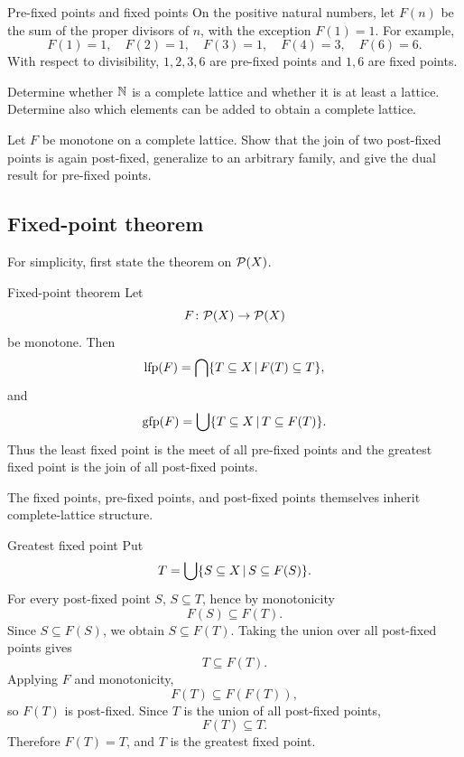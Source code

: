 \documentclass[a4paper]{article}
\newcommand{\lfp}{\operatorname{lfp}}
\newcommand{\gfp}{\operatorname{gfp}}
\begin{document}
\begin{snippetexample}{Pre-fixed points and fixed points}
    On the positive natural numbers, let \(F(n)\) be the sum of the proper divisors of \(n\), with the exception \(F(1)=1\).
    For example,
    \[
        F(1)=1,
        \quad
        F(2)=1,
        \quad
        F(3)=1,
        \quad
        F(4)=3,
        \quad
        F(6)=6.
    \]
    With respect to divisibility, \(1,2,3,6\) are pre-fixed points and \(1,6\) are fixed points.
\end{snippetexample}

\begin{snippetexercise}{}
    Determine whether \(\mathbb{N}\) is a complete lattice and whether it is at least a lattice.
    Determine also which elements can be added to obtain a complete lattice.
\end{snippetexercise}

\begin{snippetexercise}{}
    Let \(F\) be monotone on a complete lattice.
    Show that the join of two post-fixed points is again post-fixed, generalize to an arbitrary family, and give the dual result for pre-fixed points.
\end{snippetexercise}

\subsection{Fixed-point theorem}

For simplicity, first state the theorem on \(\mathcal P(X)\).

\begin{snippettheorem}{Fixed-point theorem}
    Let
    \[
        F\colon\mathcal P(X)\to\mathcal P(X)
    \]
    be monotone. Then
    \[
        \lfp(F)
        =
        \bigcap\{T\subseteq X\suchthat F(T)\subseteq T\},
    \]
    and
    \[
        \gfp(F)
        =
        \bigcup\{T\subseteq X\suchthat T\subseteq F(T)\}.
    \]
    Thus the least fixed point is the meet of all pre-fixed points and the greatest fixed point is the join of all post-fixed points.
\end{snippettheorem}

The fixed points, pre-fixed points, and post-fixed points themselves inherit complete-lattice structure.

\begin{snippetproof}{Greatest fixed point}
    Put
    \[
        T=\bigcup\{S\subseteq X\,|\, S\subseteq F(S)\}.
    \]
    For every post-fixed point \(S\), \(S\subseteq T\), hence by monotonicity
    \[
        F(S)\subseteq F(T).
    \]
    Since \(S\subseteq F(S)\), we obtain \(S\subseteq F(T)\).
    Taking the union over all post-fixed points gives
    \[
        T\subseteq F(T).
    \]
    Applying \(F\) and monotonicity,
    \[
        F(T)\subseteq F(F(T)),
    \]
    so \(F(T)\) is post-fixed.
    Since \(T\) is the union of all post-fixed points,
    \[
        F(T)\subseteq T.
    \]
    Therefore \(F(T)=T\), and \(T\) is the greatest fixed point.
\end{snippetproof}
\end{document}

